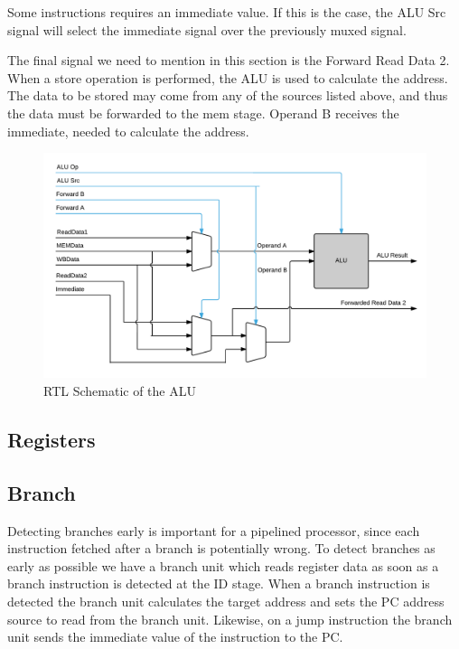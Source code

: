 Some instructions requires an immediate value. If this is the case, the ALU Src signal will select the immediate signal over the previously muxed signal.

The final signal we need to mention in this section is the Forward Read Data 2. When a store operation is performed, the ALU is used to calculate the address. The data to be stored may come from any of the sources listed above, and thus the data must be forwarded to the mem stage. Operand B receives the immediate, needed to calculate the address.


\begin{figure}[h!]
    \includegraphics[width=\linewidth]{img/ALU.png}
    \caption{RTL Schematic of the ALU}
    \label{fig:ALU}
\end{figure}

\subsection{Registers}

\subsection{Branch}
Detecting branches early is important for a pipelined processor, since each instruction fetched after a branch is potentially wrong.
To detect branches as early as possible we have a branch unit which reads register data as soon as a branch instruction is detected at the ID stage.
When a branch instruction is detected the branch unit calculates the target address and sets the PC address source to read from the branch unit.
Likewise, on a jump instruction the branch unit sends the immediate value of the instruction to the PC.


